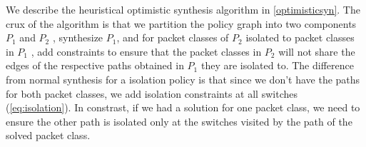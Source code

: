 We describe the heuristical optimistic synthesis algorithm in
\cref{optimisticsyn}. The crux of the algorithm is that we partition
the policy graph into two components $P_1$ and $P_2$ , synthesize $P_1$, and for packet classes of $P_2$
isolated to packet classes in $P_1$ , add constraints to ensure that the
packet classes in $P_2$ will not share the edges of the respective
paths obtained in $P_1$ they are isolated to. The difference from
normal synthesis for a isolation policy is that since we don't have
the paths for both packet classes, we add isolation constraints at all
switches (\cref{eq:isolation}). In constrast, if we had a solution for
one packet class, we need to ensure the other path is isolated only at
the switches visited by the path of the solved packet
class. 

